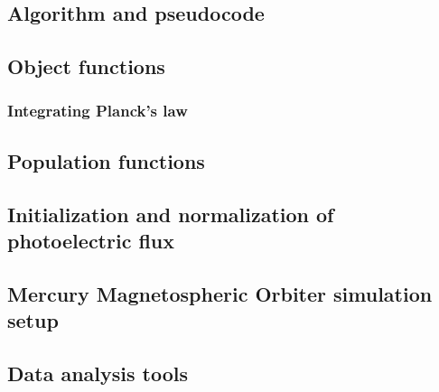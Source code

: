 \subsection{Algorithm and pseudocode}

\subsection{Object functions}
\subsubsection*{Integrating Planck's law}

\subsection{Population functions}
\subsection{Initialization and normalization of photoelectric flux}

\subsection{Mercury Magnetospheric Orbiter simulation setup}

\subsection{Data analysis tools}
